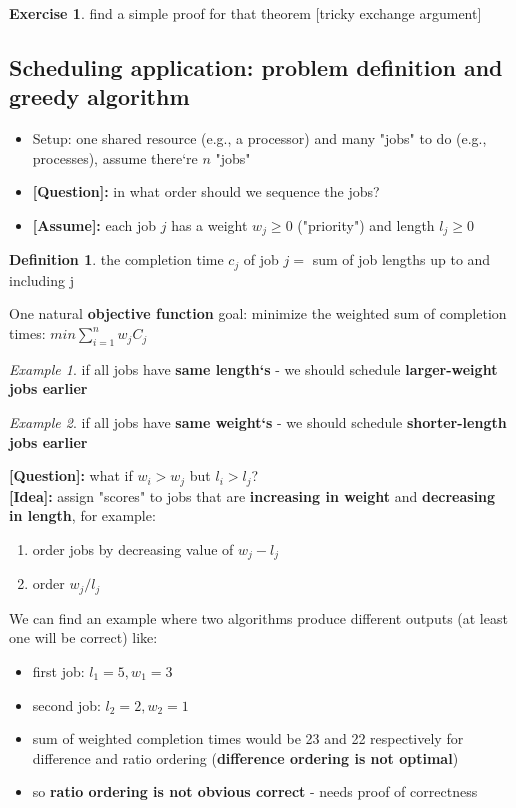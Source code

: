 \documentclass[a4paper,12pt]{article}
\theoremstyle{plain}
\theoremstyle{definition}
\newtheorem{problem}{Exercise}[section]
\newtheorem*{definition}{Definition}
\theoremstyle{remark}
\newtheorem*{example}{Example}
\begin{document}
\begin{problem} find a simple proof for that theorem [tricky exchange argument]\end{problem}



\subsection{Scheduling application: problem definition and greedy algorithm}
\begin{itemize}
\item Setup: one shared resource (e.g., a processor) and many "jobs" to do (e.g., processes), assume there`re $n$ "jobs"
\item \textbf{[Question]:} in what order should we sequence the jobs?
\item \textbf{[Assume]:} each job $j$ has a weight $w_j \geq 0 $ ("priority") and length $l_j \geq	0$
\end{itemize}

\begin{definition}the completion time $c_j$ of job $j =$ sum of job lengths up to and including j \end{definition}

One natural \textbf{objective function} goal: minimize the weighted sum of completion times: $min \sum\limits_{i = 1}^{n}w_jC_j$

\begin{example}if all jobs have \textbf{same length`s} - we should schedule \textbf{larger-weight jobs earlier}\end{example}
\begin{example}if all jobs have \textbf{same weight`s} - we should schedule \textbf{shorter-length jobs earlier}\end{example}

\textbf{[Question]:} what if $w_i > w_j$ but $l_i > l_j$?
\\

\textbf{[Idea]:} assign "scores" to jobs that are \textbf{increasing in weight} and \textbf{decreasing in length}, for example:
\begin{enumerate}
\item order jobs by decreasing value of $w_j - l_j$
\item order $w_j/l_j$
\end{enumerate}

We can find an example where two algorithms produce different outputs (at least one will be correct) like:
\begin{itemize}
\item first job: $l_1=5, w_1=3$
\item second job: $l_2=2, w_2=1$
\item sum of weighted completion times would be 23 and 22 respectively for difference and ratio ordering (\textbf{difference ordering is not optimal})
\item so \textbf{ratio ordering is not obvious correct} - needs proof of correctness
\end{itemize}
\end{document}
